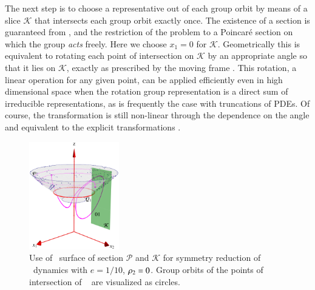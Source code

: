 The next step is to choose a representative out of each group
orbit by means of a slice $\mathcal{K}$ that
intersects each group orbit exactly once. The existence of a
section is guaranteed from , and the
restriction of the problem to a Poincar\'e section on which the
group \emph{acts} freely. Here we choose $x_1=0$ for
$\mathcal{K}$. Geometrically this is equivalent to rotating
each point of intersection on $\mathcal{K}$ by an appropriate
angle so that it lies on $\mathcal{K}$, exactly as prescribed
by the moving frame . This rotation, a linear
operation for any given point, can be applied efficiently
even in high dimensional space when the rotation group
representation is a direct sum of irreducible
representations, as is frequently the case with truncations
of PDEs. Of course, the transformation is still non-linear
through the dependence on the angle and equivalent to the
explicit transformations .

\begin{figure}[ht]
\begin{center}
  \includegraphics[width=0.35\textwidth]{../figs/CLEmartini}
\end{center}
\caption{
Use of \Poincare\ surface of section $\mathcal{P}$ and
{\csection} $\mathcal{K}$ for symmetry reduction of \CLe\
dynamics with $e=1/10$, $\rho_2=0$. Group orbits of the
points of intersection of \rpo\  are visualized as
circles.
    }
\label{fig:CLEmartini}
\end{figure}
